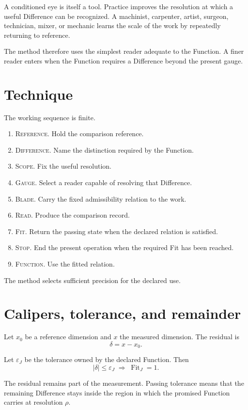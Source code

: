 \documentclass[10pt]{article}
\newcommand{\term}[1]{\textsc{#1}}
\newcommand{\fit}{\operatorname{Fit}}
\begin{document}
A conditioned eye is itself a tool. Practice improves the resolution at which a useful Difference can be recognized. A machinist, carpenter, artist, surgeon, technician, mixer, or mechanic learns the scale of the work by repeatedly returning to reference.

The method therefore uses the simplest reader adequate to the Function. A finer reader enters when the Function requires a Difference beyond the present gauge.

\section{Technique}

The working sequence is finite.

\begin{enumerate}[label=\roman*.]
\item \term{Reference}. Hold the comparison reference.
\item \term{Difference}. Name the distinction required by the Function.
\item \term{Scope}. Fix the useful resolution.
\item \term{Gauge}. Select a reader capable of resolving that Difference.
\item \term{Blade}. Carry the fixed admissibility relation to the work.
\item \term{Read}. Produce the comparison record.
\item \term{Fit}. Return the passing state when the declared relation is satisfied.
\item \term{Stop}. End the present operation when the required Fit has been reached.
\item \term{Function}. Use the fitted relation.
\end{enumerate}

The method selects sufficient precision for the declared use.

\section{Calipers, tolerance, and remainder}

Let $x_0$ be a reference dimension and $x$ the measured dimension. The residual is
\[
\delta=x-x_0.
\]

Let $\varepsilon_J$ be the tolerance owned by the declared Function. Then
\[
\boxed{|\delta|\le \varepsilon_J\;\Longrightarrow\;\fit_J=1.}
\]

The residual remains part of the measurement. Passing tolerance means that the remaining Difference stays inside the region in which the promised Function carries at resolution $\rho$.
\end{document}

